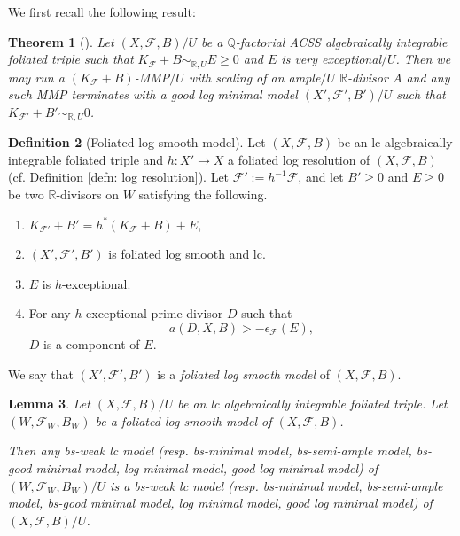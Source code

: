 \documentclass[11pt]{amsart}
\numberwithin{equation}{section}
\newcommand{\Qq}{\mathbb{Q}}
\newcommand{\Rr}{\mathbb{R}}
\newcommand{\Ff}{\mathcal{F}}
\newtheorem{thm}{Theorem}[section]
\newtheorem{lem}[thm]{Lemma}
\theoremstyle{definition}
\newtheorem{defn}[thm]{Definition}
\theoremstyle{definition}
\theoremstyle{definition}
\begin{document}
We first recall the following result:

\begin{thm}[{\cite[Theorem 9.4.1]{CHLX23}}]\label{thm: chlx23 9.4.1}
    Let $(X,\Ff,B)/U$ be a $\Qq$-factorial ACSS algebraically integrable foliated triple such that $K_{\Ff}+B\sim_{\mathbb R,U}E\geq 0$ and $E$ is very exceptional$/U$. Then we may run a $(K_{\Ff}+B)$-MMP$/U$ with scaling of an ample$/U$ $\Rr$-divisor $A$ and any such MMP terminates with a good log minimal model $(X',\Ff',B')/U$ such that $K_{\Ff'}+B'\sim_{\mathbb R,U}0$.
\end{thm}

\begin{defn}[Foliated log smooth model]\label{defn: log smooth models}
Let $(X,\Ff,B)$ be an lc algebraically integrable foliated triple and $h: X'\rightarrow X$ a foliated log resolution of $(X,\Ff,B)$ (cf. Definition \ref{defn: log resolution}). Let $\Ff':=h^{-1}\Ff$, and let $B'\geq 0$ and $E\geq 0$ be two $\Rr$-divisors on $W$ satisfying the following.
\begin{enumerate}
    \item $K_{\Ff'}+B'=h^*(K_\Ff+B)+E$,
    \item $(X',\Ff',B')$ is foliated log smooth and lc.
    \item $E$ is $h$-exceptional.
    \item For any $h$-exceptional prime divisor $D$ such that $$a(D,X,B)>-\epsilon_{\Ff}(E),$$ $D$ is a component of $E$.
\end{enumerate}
We say that $(X',\Ff',B')$ is a \emph{foliated log smooth model} of $(X,\Ff,B)$. 
\end{defn}


\begin{lem}\label{lem: g-pair version bir12 2.8}
Let $(X,\Ff,B)/U$ be an lc algebraically integrable foliated triple. Let $(W,\Ff_W,B_W)$ be a foliated log smooth model of $(X,\Ff,B)$. 

Then any bs-weak lc model (resp. bs-minimal model, bs-semi-ample model, bs-good minimal model, log minimal model, good log minimal model) of $(W,\Ff_W,B_W)/U$ is a bs-weak lc model (resp. bs-minimal model, bs-semi-ample model, bs-good minimal model, log minimal model, good log minimal model) of $(X,\Ff,B)/U$. 
\end{lem}
\end{document}
